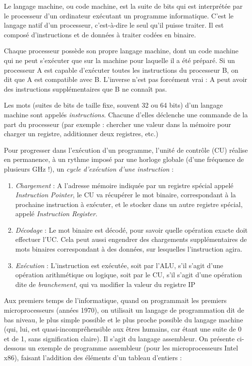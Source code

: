 \documentclass[11pt,a4paper,french,twoside]{PMCours}
\begin{document}
Le langage machine, ou code machine, est la suite de bits qui est interprétée par le processeur d'un ordinateur exécutant un programme informatique. C'est le langage natif d'un processeur, c'est-à-dire le seul qu'il puisse traiter. Il est composé d'instructions et de données à traiter codées en binaire.

Chaque processeur possède son propre langage machine, dont un code machine qui ne peut s'exécuter que sur la machine pour laquelle il a été préparé. Si un processeur A est capable d'exécuter toutes les instructions du processeur B, on dit que A est compatible avec B. L'inverse n'est pas forcément vrai : A peut avoir des instructions supplémentaires que B ne connaît pas.

Les mots (suites de bits de taille fixe, souvent 32 ou 64 bits) d'un langage machine sont appelés \emph{instructions}. Chacune d'elles déclenche une commande de la part du processeur (par exemple : chercher une valeur dans la mémoire pour charger un registre, additionner deux registres, etc.)

Pour progresser dans l'exécution d'un programme, l'unité de contrôle (CU) réalise en permanence, à un rythme imposé par une horloge globale (d'une fréquence de plusieurs GHz !), un \emph{cycle d'exécution d'une instruction} : 
\begin{enumerate}
 \item \emph{Chargement} : A l'adresse mémoire indiquée par un registre spécial appelé \emph{Instruction Pointer}, le CU va récupérer le mot binaire, correspondant à la prochaine instruction à exécuter, et le stocker dans un autre registre spécial, appelé \emph{Instruction Register}.
 \item \emph{Décodage} : Le mot binaire est décodé, pour savoir quelle opération exacte doit effectuer l'UC. Cela peut aussi engendrer des chargements supplémentaires de mots binaires correspondant à des données, sur lesquelles l'instruction agira.
 \item \emph{Exécution} : L'instruction est exécutée, soit par l'ALU, s'il s'agit d'une opération arithmétique ou logique, soit par le CU, s'il s'agit d'une opération dite de \emph{branchement}, qui va modifier la valeur du registre IP
\end{enumerate}

Aux premiers temps de l'informatique, quand on programmait les premiers microprocesseurs (années 1970), on utilisait un langage de programmation dit de bas niveau, le plus simple possible et le plus proche possible du langage machine (qui, lui, est quasi-incompréhensible aux êtres humains, car étant une suite de 0 et de 1, sans signification claire). Il s'agit du langage assembleur. On présente ci-dessous un exemple de programme assembleur (pour les microprocesseurs Intel x86), faisant l'addition des éléments d'un tableau d'entiers : 
\end{document}
